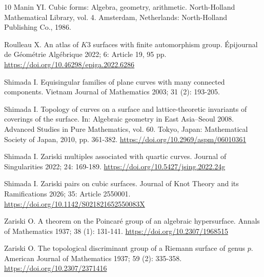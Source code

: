 \documentclass{math}
\theoremstyle{plain}
\numberwithin{equation}{section}
\begin{document}
\begin{thebibliography}{10}
Manin YI.
Cubic forms: Algebra, geometry, arithmetic.
North-Holland Mathematical Library, vol. 4.
Amsterdam, Netherlands: North-Holland Publishing Co., 1986.

Roulleau X.
An atlas of $K3$ surfaces with finite automorphism group.
Épijournal de Géométrie Algébrique 2022; 6: Article 19, 95 pp.
\url{https://doi.org/10.46298/epiga.2022.6286}

Shimada I.
Equisingular families of plane curves with many connected components.
Vietnam Journal of Mathematics 2003; 31 (2): 193-205.

Shimada I.
Topology of curves on a surface and lattice-theoretic invariants of coverings of the surface.
In: Algebraic geometry in East Asia--Seoul 2008.
Advanced Studies in Pure Mathematics, vol. 60.
Tokyo, Japan: Mathematical Society of Japan, 2010, pp. 361-382.
\url{https://doi.org/10.2969/aspm/06010361}

Shimada I.
Zariski multiples associated with quartic curves.
Journal of Singularities 2022; 24: 169-189.
\url{https://doi.org/10.5427/jsing.2022.24g}

Shimada I.
Zariski pairs on cubic surfaces.
Journal of Knot Theory and its Ramifications 2026; 35: Article 2550001.
\url{https://doi.org/10.1142/S021821652550083X}

Zariski O.
A theorem on the Poincaré group of an algebraic hypersurface.
Annals of Mathematics 1937; 38 (1): 131-141.
\url{https://doi.org/10.2307/1968515}

Zariski O.
The topological discriminant group of a Riemann surface of genus $p$.
American Journal of Mathematics 1937; 59 (2): 335-358.
\url{https://doi.org/10.2307/2371416}


\end{thebibliography}
\end{document}
